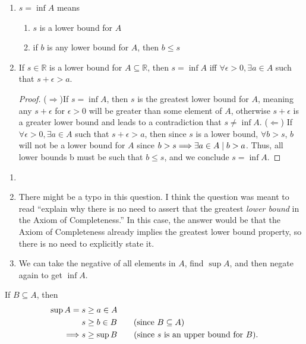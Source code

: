 \begin{exercise}
\begin{enumerate}[label=(\alph*)]
	\item  $s = \inf A$ means 
	\begin{enumerate}[label=\roman*)]
		\item $s$ is a lower bound for $A$
		\item if $b$ is any lower bound for $A$, then $b \leq s$
	\end{enumerate}
	\item If $s\in \mathbb{R}$ is a lower bound for $A \subseteq \mathbb{R}$, then $s=\inf A$ iff $\forall \epsilon > 0, \exists a \in A$ such that $s + \epsilon > a$.
	\begin{proof}
		($\Rightarrow$)If $s=\inf A$, then $s$ is the greatest lower bound for $A$, meaning any $s+ \epsilon$ for $\epsilon > 0$ will be greater than some element of $A$, otherwise $s+ \epsilon$ is a greater lower bound and leads to a contradiction that $s \neq \inf A$.
		($\Leftarrow$) If $\forall \epsilon > 0, \exists a \in A$ such that $s+\epsilon > a$, then since $s$ is a lower bound, $\forall b > s$, $b$ will not be a lower bound for $A$ since $b > s \Longrightarrow \exists a \in A \mid b > a$. Thus, all lower bounds b must be such that $b \leq s$, and we conclude $s = \inf A$.
	\end{proof}
\end{enumerate}
\end{exercise}

\begin{exercise}
\begin{enumerate}[label=(\alph*)]
	\item \TODO
	\item There might be a typo in this question. I think the question was meant to read ``explain why there is no need to assert that the greatest \textit{lower bound} in the Axiom of Completeness.'' In this case, the answer would be that the Axiom of Completeness already implies the greatest lower bound property, so there is no need to explicitly state it.
	\item We can take the negative of all elements in $A$, find $\sup A$, and then negate again to get $\inf A$.
\end{enumerate}
\end{exercise}

\begin{exercise}
	If $B \subseteq A$, then 
	\begin{align*}
		\sup A = s &\geq a \in A \\
			s &\geq b \in B \tag{since $B\subseteq A$} \\
			\Longrightarrow s &\geq \sup B \tag{since $s$ is an upper bound for $B$}.
	\end{align*}
\end{exercise}

